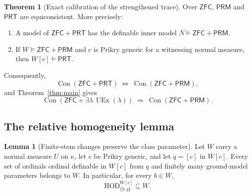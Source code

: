 \documentclass[11pt,letterpaper]{article}
\theoremstyle{definition}
\newtheorem{theorem}[definition]{Theorem}
\newtheorem{lemma}[definition]{Lemma}
\numberwithin{equation}{section}
\newcommand{\ZFC}{\mathsf{ZFC}}
\newcommand{\HOD}{\mathrm{HOD}}
\newcommand{\UEx}{\operatorname{UEx}}
\newcommand{\Con}{\operatorname{Con}}
\newcommand{\PRM}{\mathsf{PRM}}
\newcommand{\PRT}{\mathsf{PRT}}
\begin{document}
\begin{theorem}[Exact calibration of the strengthened trace]\label{thm:calibration}
Over $\ZFC$, $\PRM$ and $\PRT$ are equiconsistent. More precisely:
\begin{enumerate}
\item A model of $\ZFC+\PRT$ has the definable inner model $N\models\ZFC+\PRM$.
\item If $W\models\ZFC+\PRM$ and $c$ is Prikry generic for a witnessing normal measure, then $W[c]\models\PRT$.
\end{enumerate}
Consequently,
\[
 \Con(\ZFC+\PRT)\ \Longleftrightarrow\ \Con(\ZFC+\PRM),
\]
and Theorem~\ref{thm:main} gives
\[
 \Con(\ZFC+\exists\lambda\,\UEx(\lambda))
 \ \Longrightarrow\ \Con(\ZFC+\PRM).
\]
\end{theorem}

\subsection{The relative homogeneity lemma}

\begin{lemma}[Finite-stem changes preserve the class parameter]\label{lem:cones}
Let $W$ carry a normal measure $U$ on $\kappa$, let $c$ be Prikry generic, and let $q=[c]$ in $W[c]$. Every set of ordinals ordinal definable in $W[c]$ from $q$ and finitely many ground-model parameters belongs to $W$. In particular, for every $b\in W$,
\[
 \HOD^{W[c]}_{\{b,q\}}\subseteq W.
\]
\end{lemma}
\end{document}
